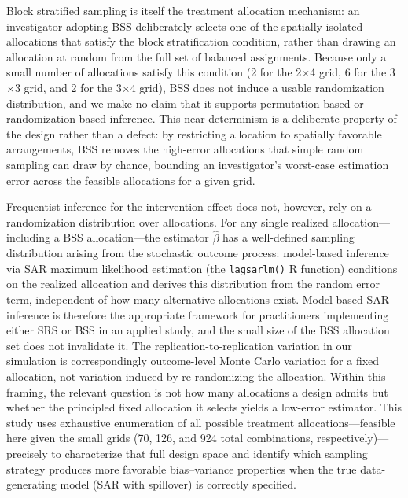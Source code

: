 \documentclass{article}[11pt]
\begin{document}
Block stratified sampling is itself the treatment allocation mechanism: an investigator adopting BSS deliberately selects one of the spatially isolated allocations that satisfy the block stratification condition, rather than drawing an allocation at random from the full set of balanced assignments. Because only a small number of allocations satisfy this condition (2 for the 2$\times$4 grid, 6 for the 3$\times$3 grid, and 2 for the 3$\times$4 grid), BSS does not induce a usable randomization distribution, and we make no claim that it supports permutation-based or randomization-based inference. This near-determinism is a deliberate property of the design rather than a defect: by restricting allocation to spatially favorable arrangements, BSS removes the high-error allocations that simple random sampling can draw by chance, bounding an investigator's worst-case estimation error across the feasible allocations for a given grid.

Frequentist inference for the intervention effect does not, however, rely on a randomization distribution over allocations. For any single realized allocation---including a BSS allocation---the estimator $\hat{\beta}$ has a well-defined sampling distribution arising from the stochastic outcome process: model-based inference via SAR maximum likelihood estimation (the \texttt{lagsarlm()} R function) conditions on the realized allocation and derives this distribution from the random error term, independent of how many alternative allocations exist. Model-based SAR inference is therefore the appropriate framework for practitioners implementing either SRS or BSS in an applied study, and the small size of the BSS allocation set does not invalidate it. The replication-to-replication variation in our simulation is correspondingly outcome-level Monte Carlo variation for a fixed allocation, not variation induced by re-randomizing the allocation. Within this framing, the relevant question is not how many allocations a design admits but whether the principled fixed allocation it selects yields a low-error estimator. This study uses exhaustive enumeration of all possible treatment allocations---feasible here given the small grids (70, 126, and 924 total combinations, respectively)---precisely to characterize that full design space and identify which sampling strategy produces more favorable bias--variance properties when the true data-generating model (SAR with spillover) is correctly specified.
\end{document}
